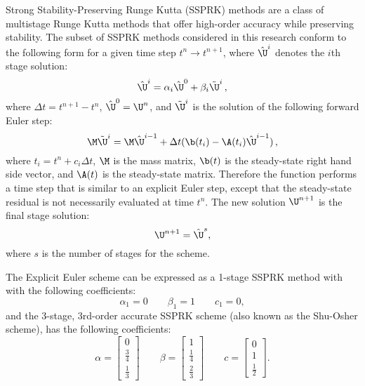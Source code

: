 Strong Stability-Preserving Runge Kutta (SSPRK) methods are a class of multistage
Runge Kutta methods that offer high-order accuracy while preserving stability.
The subset of SSPRK methods considered in this research conform to the
following form for a given time step $t^n\rightarrow t^{n+1}$,
where $\hat{\U}^i$ denotes the $i$th stage solution:
\begin{equation}
   \hat{\U}^i = \alpha_i\hat{\U}^0
   + \beta_i\tilde{\U}^i \eqc
\end{equation}
where $\Delta t=t^{n+1}-t^n$, $\hat{\U}^0=\U^n$,
and $\tilde{\U}^i$ is the solution of the following forward Euler
step:
\begin{equation}
   \M\tilde{\U}^i = \M\hat{\U}^{i-1}
   + \Delta t(\b(t_i) - \A(t_i)\hat{\U}^{i-1}) \eqc
\end{equation}
where $t_i = t^n+c_i\Delta t$,
$\M$ is the mass matrix, $\b(t)$ is the steady-state
right hand side vector, and $\A(t)$ is the steady-state matrix.
Therefore the function performs a time step that is similar to an
explicit Euler step, except that the steady-state residual is not
necessarily evaluated at time $t^n$. The new solution $\U^{n+1}$
is the final stage solution:
\begin{equation}
   \U^{n+1} = \hat{\U}^s,
\end{equation}
where $s$ is the number of stages for the scheme.

The Explicit Euler scheme can be expressed as a 1-stage SSPRK method with
with the following coefficients:
\begin{equation}
   \alpha_1 = 0\qquad\beta_1 = 1\qquad c_1 = 0,
\end{equation}
and the 3-stage, 3rd-order accurate SSPRK scheme (also known as the Shu-Osher
scheme), has the following coefficients:
\begin{equation}
   \alpha = \left[\begin{array}{c}0\\\frac{3}{4}\\\frac{1}{3}\end{array}\right]
   \qquad\beta = \left[\begin{array}{c}1\\\frac{1}{4}\\\frac{2}{3}\end{array}\right]
   \qquad c = \left[\begin{array}{c}0\\1\\\frac{1}{2}\end{array}\right].
\end{equation}
